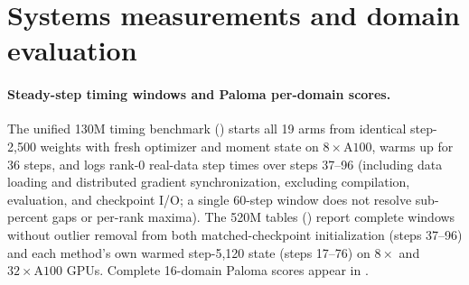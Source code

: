 

\FloatBarrier
\section{Systems measurements and domain evaluation}
\label{app:appendix_systems}

\paragraph{Steady-step timing windows and Paloma per-domain scores.}
The unified 130M timing benchmark () starts all 19 arms from identical step-2,500 weights with fresh optimizer and moment state on $8\times\text{A100}$, warms up for 36 steps, and logs rank-0 real-data step times over steps 37--96 (including data loading and distributed gradient synchronization, excluding compilation, evaluation, and checkpoint I/O; a single 60-step window does not resolve sub-percent gaps or per-rank maxima). The 520M tables () report complete windows without outlier removal from both matched-checkpoint initialization (steps 37--96) and each method's own warmed step-5,120 state (steps 17--76) on $8\times$ and $32\times\text{A100}$ GPUs. Complete 16-domain Paloma scores appear in .




